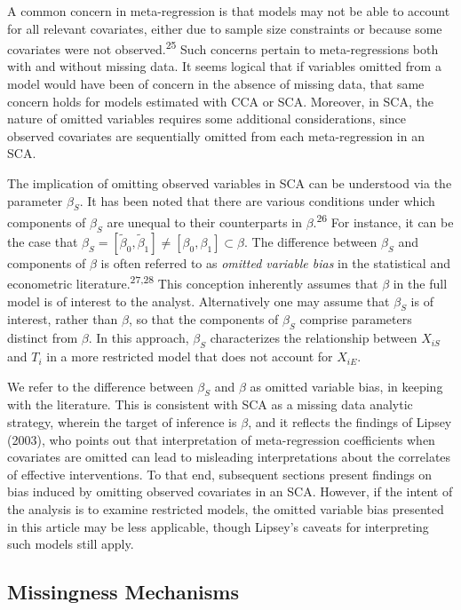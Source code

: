 \documentclass[
]{article}
\begin{document}
A common concern in meta-regression is that models may not be able to account for all relevant covariates, either due to sample size constraints or because some covariates were not observed.\textsuperscript{25}
Such concerns pertain to meta-regressions both with and without missing data.
It seems logical that if variables omitted from a model would have been of concern in the absence of missing data, that same concern holds for models estimated with CCA or SCA.
Moreover, in SCA, the nature of omitted variables requires some additional considerations, since observed covariates are sequentially omitted from each meta-regression in an SCA.

The implication of omitting observed variables in SCA can be understood via the parameter \(\beta_S\).
It has been noted that there are various conditions under which components of \(\beta_S\) are unequal to their counterparts in \(\beta\).\textsuperscript{26}
For instance, it can be the case that \(\beta_S = [\tilde{\beta}_0, \tilde{\beta}_1] \neq [\beta_0, \beta_1] \subset \beta\).
The difference between \(\beta_S\) and components of \(\beta\) is often referred to as \emph{omitted variable bias} in the statistical and econometric literature.\textsuperscript{27,28}
This conception inherently assumes that \(\beta\) in the full model is of interest to the analyst.
Alternatively one may assume that \(\beta_S\) is of interest, rather than \(\beta\), so that the components of \(\beta_S\) comprise parameters distinct from \(\beta\).
In this approach, \(\beta_S\) characterizes the relationship between \(X_{iS}\) and \(T_i\) in a more restricted model that does not account for \(X_{iE}\).

We refer to the difference between \(\beta_S\) and \(\beta\) as omitted variable bias, in keeping with the literature.
This is consistent with SCA as a missing data analytic strategy, wherein the target of inference is \(\beta\), and it reflects the findings of Lipsey (2003), who points out that interpretation of meta-regression coefficients when covariates are omitted can lead to misleading interpretations about the correlates of effective interventions.
To that end, subsequent sections present findings on bias induced by omitting observed covariates in an SCA.
However, if the intent of the analysis is to examine restricted models, the omitted variable bias presented in this article may be less applicable, though Lipsey's caveats for interpreting such models still apply.

\hypertarget{missingness-mechanisms}{%
\subsection{Missingness Mechanisms}\label{missingness-mechanisms}}
\end{document}
